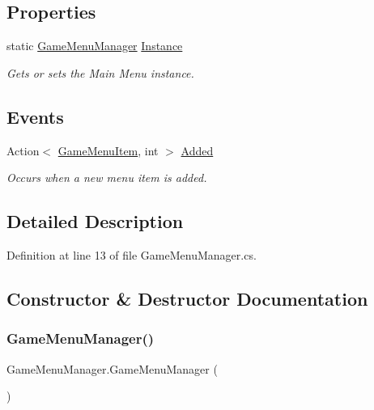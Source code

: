 \subsection*{Properties}
\begin{DoxyCompactItemize}
\item 
static \hyperlink{class_game_menu_manager}{Game\+Menu\+Manager} \hyperlink{class_game_menu_manager_ad98a6509494a0988d2cc845e3b8cc089}{Instance}
\begin{DoxyCompactList}\small\item\em Gets or sets the Main Menu instance. \end{DoxyCompactList}\end{DoxyCompactItemize}
\subsection*{Events}
\begin{DoxyCompactItemize}
\item 
Action$<$ \hyperlink{class_game_menu_item}{Game\+Menu\+Item}, int $>$ \hyperlink{class_game_menu_manager_a5628e819ba6ebe7d3905de7af1843b9f}{Added}
\begin{DoxyCompactList}\small\item\em Occurs when a new menu item is added. \end{DoxyCompactList}\end{DoxyCompactItemize}


\subsection{Detailed Description}


Definition at line 13 of file Game\+Menu\+Manager.\+cs.



\subsection{Constructor \& Destructor Documentation}
\mbox{\label{class_game_menu_manager_a7cab6d4a32b636bf93a835f9be82b00a}} 
\subsubsection{\texorpdfstring{Game\+Menu\+Manager()}{GameMenuManager()}}
{\footnotesize\ttfamily Game\+Menu\+Manager.\+Game\+Menu\+Manager (\begin{DoxyParamCaption}{ }\end{DoxyParamCaption})}



